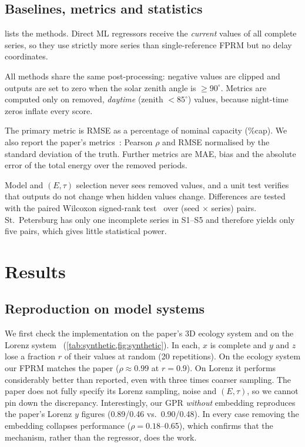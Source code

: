 \documentclass[11pt,a4paper]{article}
\newcommand{\tabdir}{../tables/en}
\begin{document}
\subsection{Baselines, metrics and statistics}

 lists the methods.
Direct ML regressors receive the \emph{current} values of all complete series, so they use strictly more series than single-reference FPRM but no delay coordinates.

All methods share the same post-processing: negative values are clipped and outputs are set to zero when the solar zenith angle is $\ge 90^\circ$.
Metrics are computed only on removed, \emph{daytime} (zenith $<85^\circ$) values, because night-time zeros inflate every score.

The primary metric is RMSE as a percentage of nominal capacity (\%cap).
We also report the paper's metrics~\cite[Eq.~19]{wu2026fprm}: Pearson $\rho$ and RMSE normalised by the standard deviation of the truth.
Further metrics are MAE, bias and the absolute error of the total energy over the removed periods.

Model and $(E,\tau)$ selection never sees removed values, and a unit test verifies that outputs do not change when hidden values change.
Differences are tested with the paired Wilcoxon signed-rank test~\cite{wilcoxon1945} over (seed $\times$ series) pairs.
St.\ Petersburg has only one incomplete series in S1--S5 and therefore yields only five pairs, which gives little statistical power.

\begin{table}[t]
  \centering\small
  \caption{Methods. $^\dagger$: extension not in the original paper.}
  \label{tab:methods}
  
\end{table}

\section{Results}\label{sec:results}

\subsection{Reproduction on model systems}\label{sec:synthetic}

We first check the implementation on the paper's 3D ecology system and on the Lorenz system~\cite{lorenz1963} (\cref{tab:synthetic,fig:synthetic}).
In each, $x$ is complete and $y$ and $z$ lose a fraction $r$ of their values at random (20 repetitions).
On the ecology system our FPRM matches the paper ($\rho\approx0.99$ at $r=0.9$).
On Lorenz it performs considerably better than reported, even with three times coarser sampling.
The paper does not fully specify its Lorenz sampling, noise and $(E,\tau)$, so we cannot pin down the discrepancy.
Interestingly, our GPR \emph{without} embedding reproduces the paper's Lorenz $y$ figures (0.89/0.46 vs.\ 0.90/0.48).
In every case removing the embedding collapses performance ($\rho=0.18$--0.65), which confirms that the mechanism, rather than the regressor, does the work.
\end{document}
